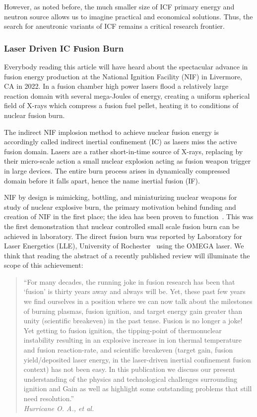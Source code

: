\documentclass[particles,article,accept,pdftex,moreauthors]{Definitions/mdpi}
\begin{document}
However, as noted before, the much smaller size of ICF primary energy and neutron source allows us to imagine practical and economical solutions. Thus, the search for aneutronic variants of ICF remains a critical research frontier.

\subsubsection{Laser Driven IC Fusion Burn}\label{sssec:NIF}
Everybody reading this article will have heard about the spectacular advance in fusion energy production at the National Ignition Facility (NIF) in Livermore, CA in 2022. In a fusion chamber high power lasers flood a relatively large reaction domain with several mega-Joules of energy, creating a uniform spherical field of X-rays which compress a fusion fuel pellet, heating it to conditions of nuclear fusion burn.

The indirect NIF implosion method to achieve nuclear fusion energy is accordingly called indirect inertial confinement (IC) as lasers miss the active fusion domain. Lasers are a rather short-in-time source of X-rays, replacing by their micro-scale action a small nuclear explosion acting as fusion weapon trigger in large devices. The entire burn process arises in dynamically compressed domain before it falls apart, hence the name inertial fusion (IF). 

NIF by design is mimicking, bottling, and miniaturizing nuclear weapons for study of nuclear explosive burn, the primary motivation behind funding and creation of NIF in the first place; the idea has been proven to function~\cite{Zylstra:2022burn,Hurricane:2023Review,Hurricane:2025}. This was the first demonstration that nuclear controlled small scale fusion burn can be achieved in laboratory. The direct fusion burn was reported by Laboratory for Laser Energetics (LLE), University of Rochester~\cite{Manion:2022Omega,Gopalaswamy:2024direct} using the OMEGA laser. We think that reading the abstract of a recently published review will illuminate the scope of this achievement:
\begin{quote}
``For many decades, the running joke in fusion research has been that `fusion' is thirty years away and always will be. Yet, these past few years we find ourselves in a position where we can now talk about the milestones of burning plasmas, fusion ignition, and target energy gain greater than unity (scientific breakeven) in the past tense. Fusion is no longer a joke! Yet getting to fusion ignition, the tipping-point of thermonuclear instability resulting in an explosive increase in ion thermal temperature and fusion reaction-rate, and scientific breakeven (target gain, fusion yield/deposited laser energy, in the laser-driven inertial confinement fusion context) has not been easy. In this publication we discuss our present understanding of the physics and technological challenges surrounding ignition and Gain as well as highlight some outstanding problems that still need resolution.''\\ \emph{Hurricane O. A., et al.}~\cite{Hurricane:2025}
\end{quote}
 
\end{document}
